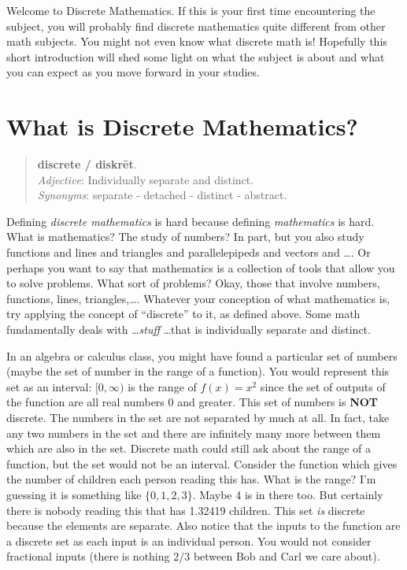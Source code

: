 \documentclass[12pt]{article}
\begin{document}
Welcome to Discrete Mathematics.  If this is your first time encountering the subject, you will probably find discrete mathematics quite different from other math subjects.  You might not even know what discrete math is!  Hopefully this short introduction will shed some light on what the subject is about and what you can expect as you move forward in your studies.

\section{What is Discrete Mathematics?}

\begin{quotation}
\noindent \textbf{dis\textperiodcentered crete / dis\textquotesingle kr\={e}t}. \\ {\em Adjective}: Individually separate and distinct.  \\{\em Synonyms}: separate - detached - distinct - abstract.
\end{quotation}

Defining {\em discrete mathematics} is hard because defining {\em mathematics} is hard.  What is mathematics?  The study of numbers?  In part, but you also study functions and lines and triangles and parallelepipeds and vectors and \ldots.  Or perhaps you want to say that mathematics is a collection of tools that allow you to solve problems.  What sort of problems?  Okay, those that involve numbers, functions, lines, triangles,\ldots.  Whatever your conception of what mathematics is, try applying the concept of ``discrete'' to it, as defined above.  Some math fundamentally deals with \ldots {\em stuff} \ldots that is individually separate and distinct.  

In an algebra or calculus class, you might have found a particular set of numbers (maybe the set of number in the range of a function).  You would represent this set as an interval: $[0,\infty)$ is the range of $f(x) = x^2$ since the set of outputs of the function are all real numbers 0 and greater.  This set of numbers is \textbf{NOT} discrete.  The numbers in the set are not separated by much at all.  In fact, take any two numbers in the set and there are infinitely many more between them which are also in the set.  Discrete math could still ask about the range of a function, but the set would not be an interval.  Consider the function which gives the number of children each person reading this has.  What is the range?  I'm guessing it is something like $\{0, 1, 2, 3\}$.  Maybe 4 is in there too.  But certainly there is nobody reading this that has 1.32419 children.  This set {\em is} discrete because the elements are separate.  Also notice that the inputs to the function are a discrete set as each input is an individual person.  You would not consider fractional inputs (there is nothing $2/3$ between Bob and Carl we care about).  
\end{document}
